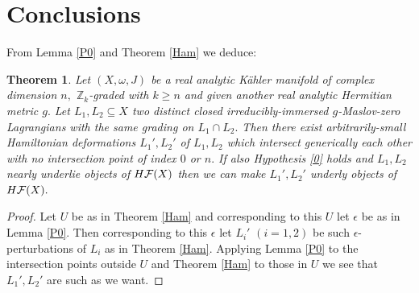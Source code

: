 \documentclass{article}
\theoremstyle{plain}%
\newtheorem{thm}{Theorem}[section]
\theoremstyle{definition}
\numberwithin{equation}{section}
\numberwithin{figure}{section}
\def\l{\label}
\def\ge{\geqslant}
\def\cF{{\mathbin{\cal F}}}
\def\Z{{\mathbin{\mathbb Z}}}
\def\ep{\epsilon}
\def\om{\omega}
\def\sb{\subseteq}
\begin{document}
\section{Conclusions}\l{sec5}
From Lemma \ref{P0} and Theorem \ref{Ham} we deduce:
\begin{thm}\l{P1}
Let $(X,\om,J)$ be a real analytic K\"ahler manifold of complex dimension $n,$ $\Z_k$-graded with $k\ge n$ and given 
another real analytic Hermitian metric $g.$
Let $L_1,L_2\sb X$ two distinct closed irreducibly-immersed $g$-Maslov-zero Lagrangians with the same grading on $L_1\cap L_2.$
Then there exist arbitrarily-small Hamiltonian deformations $L_1',L_2'$ of $L_1,L_2$
which intersect generically each other with no intersection point of index $0$ or $n.$
If also Hypothesis \ref{0} holds and $L_1,L_2$ nearly underlie objects of $H\cF(X)$ then we can make $L_1',L_2'$ underly objects of $H\cF(X).$
\end{thm}
\begin{proof}
Let $U$ be as in Theorem \ref{Ham} and corresponding to this $U$ let $\ep$ be as in Lemma \ref{P0}.
Then corresponding to this $\ep$ let $L_i'$ $(i=1,2)$ be such $\ep$-perturbations of $L_i$ as in Theorem \ref{Ham}.
Applying Lemma \ref{P0} to the intersection points outside $U$
and Theorem \ref{Ham} to those in $U$
we see that $L_1',L_2'$ are such as we want.
\end{proof}
\end{document}
